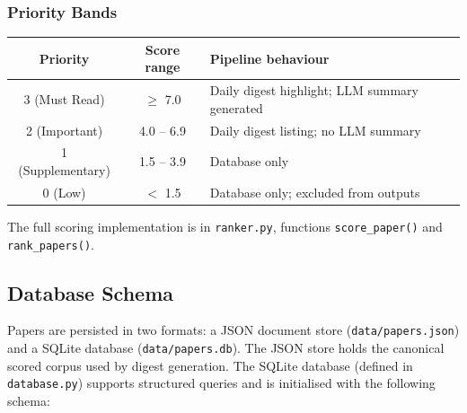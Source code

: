 \subsubsection{Priority Bands}

\begin{threeparttable}
\caption{Priority band thresholds and pipeline behaviour.}
\label{tab:priority_bands}
\begin{tabularx}{\linewidth}{ccl}
\toprule
\textbf{Priority} & \textbf{Score range} & \textbf{Pipeline behaviour} \\
\midrule
3 (Must Read) & $\geq$ 7.0 & Daily digest highlight; LLM summary generated \\
2 (Important) & 4.0 -- 6.9 & Daily digest listing; no LLM summary \\
1 (Supplementary) & 1.5 -- 3.9 & Database only \\
0 (Low) & $<$ 1.5 & Database only; excluded from outputs \\
\bottomrule
\end{tabularx}
\end{threeparttable}

The full scoring implementation is in \texttt{ranker.py}, functions
\texttt{score\_paper()} and \texttt{rank\_papers()}.


\subsection{Database Schema}
\label{sec:app_db_schema}

Papers are persisted in two formats: a JSON document store
(\texttt{data/papers.json}) and a SQLite database (\texttt{data/papers.db}).
The JSON store holds the canonical scored corpus used by digest generation.
The SQLite database (defined in \texttt{database.py}) supports structured
queries and is initialised with the following schema:

